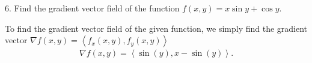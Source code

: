 \documentclass{report}
\begin{document}
    \bigbreak \noindent 
    \begin{mdframed}
        6. Find the gradient vector field of the function \(f(x, y) = x \sin y + \cos y\).
    \end{mdframed}
    \bigbreak \noindent 
    To find the gradient vector field of the given function, we simply find the gradient vector $\nabla f(x,y) = \left\langle f_{x}(x,y), f_{y}(x,y) \right\rangle $
    \begin{align*}
        \nabla f(x,y) = \left\langle \sin{\left(y\right)},x-\sin{\left(y\right)} \right\rangle
    .\end{align*}


 
\end{document}
